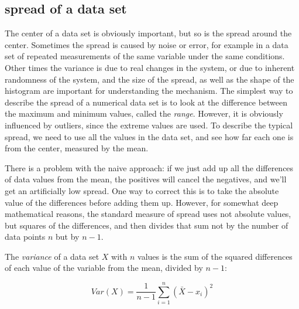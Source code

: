 \documentclass[
  letterpaper,
  DIV=11,
  numbers=noendperiod]{scrreprt}
\begin{document}
\hypertarget{spread-of-a-data-set}{%
\subsection{spread of a data set}\label{spread-of-a-data-set}}

The center of a data set is obviously important, but so is the spread
around the center. Sometimes the spread is caused by noise or error, for
example in a data set of repeated measurements of the same variable
under the same conditions. Other times the variance is due to real
changes in the system, or due to inherent randomness of the system, and
the size of the spread, as well as the shape of the histogram are
important for understanding the mechanism. The simplest way to describe
the spread of a numerical data set is to look at the difference between
the maximum and minimum values, called the 
\emph{range}. However, it is obviously influenced by outliers, since the
extreme values are used. To describe the typical spread, we need to use
all the values in the data set, and see how far each one is from the
center, measured by the mean.

There is a problem with the naive approach: if we just add up all the
differences of data values from the mean, the positives will cancel the
negatives, and we'll get an artificially low spread. One way to correct
this is to take the absolute value of the differences before adding them
up. However, for somewhat deep mathematical reasons, the standard
measure of spread uses not absolute values, but squares of the
differences, and then divides that sum not by the number of data points
\(n\) but by \(n-1\).

\begin{tcolorbox}[enhanced jigsaw, arc=.35mm, colframe=quarto-callout-note-color-frame, left=2mm, opacitybacktitle=0.6, breakable, title=\textcolor{quarto-callout-note-color}{\faInfo}\hspace{0.5em}{Definition}, toprule=.15mm, coltitle=black, bottomtitle=1mm, toptitle=1mm, colback=white, leftrule=.75mm, colbacktitle=quarto-callout-note-color!10!white, titlerule=0mm, opacityback=0, rightrule=.15mm, bottomrule=.15mm]

The \emph{variance} of a data set \(X\) with \(n\) values is the sum of
the squared differences of each value of the variable from the mean,
divided by \(n-1\):

\end{tcolorbox}

\begin{equation}
 Var(X) = \frac{1}{n-1} \sum_{i=1}^n (\bar X - x_i)^2
\end{equation}
\end{document}
